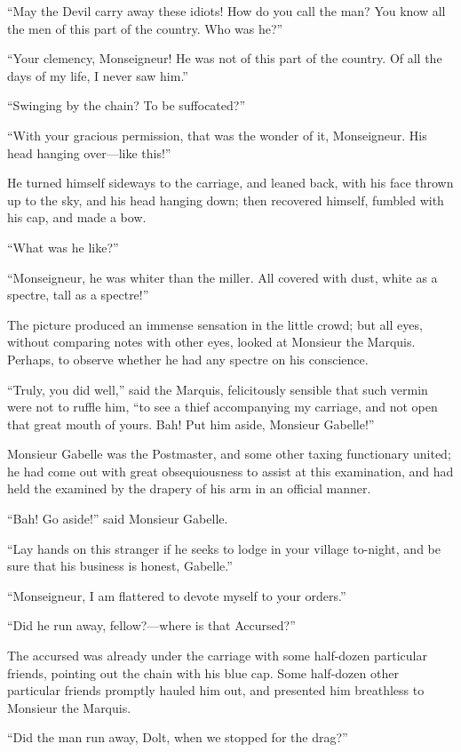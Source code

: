 ``May the Devil carry away these idiots!  How do you call the man?
You know all the men of this part of the country.  Who was he?''

``Your clemency, Monseigneur!  He was not of this part of the country.
Of all the days of my life, I never saw him.''

``Swinging by the chain?  To be suffocated?''

``With your gracious permission, that was the wonder of it,
Monseigneur.  His head hanging over---like this!''

He turned himself sideways to the carriage, and leaned back, with his
face thrown up to the sky, and his head hanging down; then recovered
himself, fumbled with his cap, and made a bow.

``What was he like?''

``Monseigneur, he was whiter than the miller.  All covered with dust,
white as a spectre, tall as a spectre!''

The picture produced an immense sensation in the little crowd;
but all eyes, without comparing notes with other eyes, looked at
Monsieur the Marquis.  Perhaps, to observe whether he had any spectre
on his conscience.

``Truly, you did well,'' said the Marquis, felicitously sensible that
such vermin were not to ruffle him, ``to see a thief accompanying my
carriage, and not open that great mouth of yours.  Bah!  Put him aside,
Monsieur Gabelle!''

Monsieur Gabelle was the Postmaster, and some other taxing functionary
united; he had come out with great obsequiousness to assist at this
examination, and had held the examined by the drapery of his arm in
an official manner.

``Bah!  Go aside!'' said Monsieur Gabelle.

``Lay hands on this stranger if he seeks to lodge in your village
to-night, and be sure that his business is honest, Gabelle.''

``Monseigneur, I am flattered to devote myself to your orders.''

``Did he run away, fellow?---where is that Accursed?''

The accursed was already under the carriage with some half-dozen
particular friends, pointing out the chain with his blue cap.
Some half-dozen other particular friends promptly hauled him out,
and presented him breathless to Monsieur the Marquis.

``Did the man run away, Dolt, when we stopped for the drag?''

